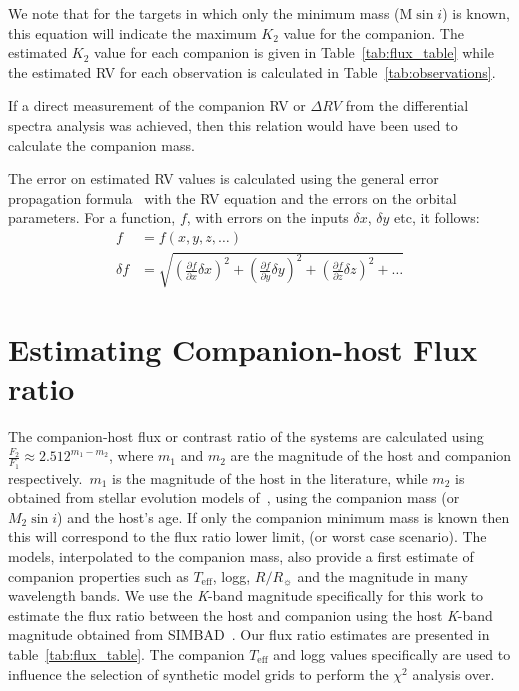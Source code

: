 \documentclass[fleqn,usenatbib]{mnras}
\begin{document}
    We note that for the targets in which only the minimum mass (\(\textrm{M}\sin{i} \)) is known, this equation will indicate the maximum \(K_2\) value for the companion. The estimated \(K_2\) value for each companion is given in Table~\ref{tab:flux_table} while the estimated RV for each observation is calculated in Table~\ref{tab:observations}.
    
    If a direct measurement of the companion RV or \(\Delta RV \) from the differential spectra analysis was achieved, then this relation would have been used to calculate the companion mass.
    
    The error on estimated RV values is calculated using the general error propagation formula~\citep{ku_notes_1966} with the RV equation and the errors on the orbital parameters. For a function, \(f\), with errors on the inputs \(\delta x\), \(\delta y\) etc, it follows: 
    \begin{align}
    f &= f(x, y, z, \ldots)\\
    \delta f &= \sqrt{{\left( \frac{\partial f}{\partial x} \delta x\right)}^2 + {\left(\frac{\partial f}{\partial y} \delta y\right)}^2 + {\left(\frac{\partial f}{\partial z} \delta z\right)}^2 + \ldots}
    \end{align}  
    
    
    \section{Estimating Companion-host Flux ratio}
    \label{compaion flux ration}
    The companion-host flux or contrast ratio of the systems are calculated using \( \frac{F_{2}}{F_{1}} \approx 2.512^{m_{1}-m_{2}} \), where \(m_{1} \) and \(m_{2} \) are the magnitude of the host and companion respectively.\ \(m_{1} \) is the magnitude of the host in the literature, while \(m_{2} \) is obtained from stellar evolution models of~\citet{baraffe_evolutionary_2003, baraffe_new_2015}, using the companion mass (or \(M_{2}\sin{i}\)) and the host's age. If only the companion minimum mass is known then this will correspond to the flux ratio lower limit, (or worst case scenario). The models, interpolated to the companion mass, also provide a first estimate of companion properties such as \(T_{\textrm{eff}}\), logg, \(R/R_{\sun}\) and the magnitude in many wavelength bands.
    We use the \textit{K}-band magnitude specifically for this work to estimate the flux ratio between the host and companion using the host \textit{K}-band magnitude obtained from SIMBAD~\citep{wenger_simbad_2000}. Our flux ratio estimates are presented in table~\ref{tab:flux_table}.
    The companion \(T_{\textrm{eff}}\) and logg values specifically are used to influence the selection of synthetic model grids to perform the \(\chi^2\) analysis over.
    
\end{document}
